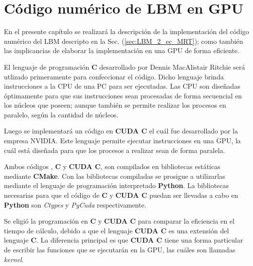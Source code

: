\chapter{Código numérico de LBM en GPU}
\graphicspath{{figs/cap3/}}
\label{cap3}




En el presente capítulo se realizará la descripción de la implementación del código numérico del LBM descripto en la Sec. (\ref{sec:LBM_2_ec_MRT}); como también las implicancias de elaborar la implementación en una GPU de forma eficiente.

El lenguaje de programación \textbf{C} desarrollado por Dennis MacAlistair Ritchie será utlizado primeramente para confeccionar el código. Dicho lenguaje brinda instrucciones a la CPU de una PC para ser ejecutadas. Las CPU son diseñadas óptimamente para que sus instrucciones sean procesadas de forma secuencial en los núcleos que poseen; aunque también se permite realizar los procesos en paralelo, según la cantidad de núcleos.

Luego se implementará un código en \textbf{CUDA C} el cuál fue desarrollado por la empresa NVIDIA. Este lenguaje permite ejecutar instrucciones en una GPU, la cuál está diseñada para que los procesos a realizar sean de forma paralela.

Ambos códigos , \textbf{C} y \textbf{CUDA C}, son compilados en bibliotecas estáticas mediante \textbf{CMake}. Con las bibliotecas compiladas se prosigue a utilizarlas mediante el lenguaje de programación interpretado \textbf{Python}. La bibliotecas necesarias para que el código de \textbf{C} y \textbf{CUDA C} puedan ser llevadas a cabo en \textbf{Python} son \textit{Ctypes} y \textit{PyCuda} respectivamente.

Se eligió la programación en \textbf{C} y \textbf{CUDA C} para comparar la eficiencia en el tiempo de cálculo, debido a que el lenguaje \textbf{CUDA C} es una extensión del lenguaje \textbf{C}. La diferencia principal es que \textbf{CUDA C}  tiene una forma particular de escribir las funciones que se ejecutarán en la GPU, las cuáles son llamadas \textit{kernel}.

